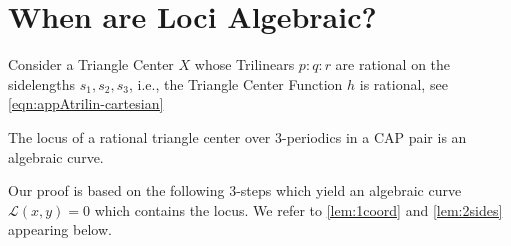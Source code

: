 \section{When are Loci Algebraic?}
\label{sec:07-algebraic-loci}

Consider a Triangle Center $X$ whose Trilinears $p:q:r$ are rational on the sidelengths $s_1,s_2,s_3$, i.e., the Triangle Center Function $h$ is rational, see  
\cref{eqn:appAtrilin-cartesian}

\begin{theorem}
The locus of a rational triangle center
over 3-periodics in a CAP pair is an algebraic curve.
\label{thm:07-rational-center}
\end{theorem}

Our proof is based on the following 3-steps which yield an algebraic curve $\mathcal{L}(x,y)=0$ which contains the locus. We refer to \cref{lem:1coord} and \cref{lem:2sides} appearing below. %

